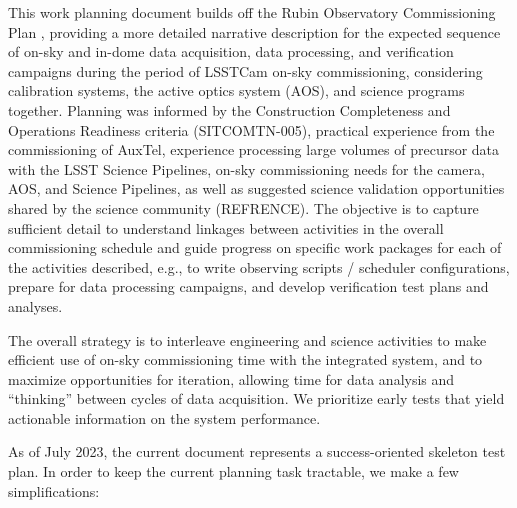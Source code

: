 \documentclass[SE,authoryear,toc,lsstdraft]{lsstdoc}
\begin{document}
This work planning document builds off the Rubin Observatory Commissioning Plan , providing a more detailed narrative description for the expected sequence of on-sky and in-dome data acquisition, data processing, and verification campaigns during the period of LSSTCam on-sky commissioning, considering calibration systems, the active optics system (AOS), and science programs together.
Planning was informed by the Construction Completeness and Operations Readiness criteria (SITCOMTN-005), practical experience from the commissioning of AuxTel, experience processing large volumes of precursor data with the LSST Science Pipelines, on-sky commissioning needs for the camera, AOS, and Science Pipelines, as well as suggested science validation opportunities shared by the science community (REFRENCE).
The objective is to capture sufficient detail to understand linkages between activities in the overall commissioning schedule and guide progress on specific work packages for each of the activities described, e.g., to write observing scripts / scheduler configurations, prepare for data processing campaigns, and develop verification test plans and analyses.

The overall strategy is to interleave engineering and science activities to make efficient use of on-sky commissioning time with the integrated system, and to maximize opportunities for iteration, allowing time for data analysis and ``thinking'' between cycles of data acquisition.
We prioritize early tests that yield actionable information on the system performance.



As of July 2023, the current document represents a success-oriented skeleton test plan.
In order to keep the current planning task tractable, we make a few simplifications:
\end{document}
